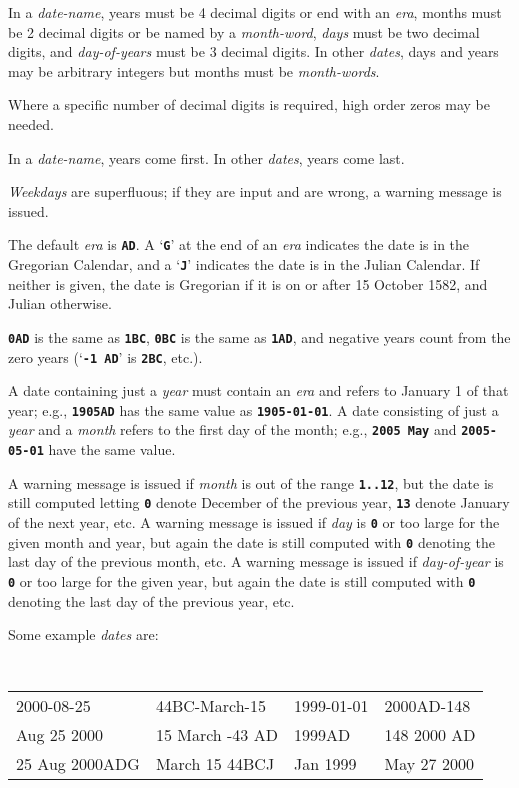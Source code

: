 \documentclass[12pt]{article}
\newcommand{\TT}[1]{{\tt \bfseries #1}}
\newenvironment{indpar}[1][0.3in]%
	{\begin{list}{}%
		     {\setlength{\itemsep}{0in}%
		      \setlength{\topsep}{0in}%
		      \setlength{\parsep}{1ex}%
		      \setlength{\labelwidth}{#1}%
		      \setlength{\leftmargin}{#1}%
		      \addtolength{\leftmargin}{\labelsep}}%
	 \item}%
	{\end{list}}
\begin{document}
In a {\em date-name}, years must be 4 decimal digits or
end with an {\em era}, months must be 2 decimal digits or
be named by a {\em month-word}, {\em days} must be two decimal
digits, and {\em day-of-years} must be 3 decimal digits.
In other {\em dates}, days and years may be arbitrary integers
but months must be {\em month-words}.

Where a specific number of decimal digits is required,
high order zeros may be needed.

In a {\em date-name}, years come first.  In other {\em dates},
years come last.

{\em Weekdays} are superfluous; if they are input and are wrong,
a warning message is issued.

The default {\em era} is \TT{AD}.
A `\TT{G}' at the end of an {\em era} indicates the date is in the
Gregorian Calendar, and a `\TT{J}' indicates the date is in the Julian
Calendar.  If neither is given, the date is Gregorian if it is on
or after 15 October 1582, and Julian otherwise.

\TT{0AD} is the same as \TT{1BC}, \TT{0BC} is the same as \TT{1AD},
and negative years count from the zero years (`\TT{-1 AD}' is \TT{2BC},
etc.).

A date containing just a {\em year} must contain an {\em era}
and refers to January 1 of that
year; e.g., \TT{1905AD} has the same value as \TT{1905-01-01}.
A date consisting of just a {\em year} and a {\em month}
refers to the first day of the month;
e.g., \TT{2005 May} and \TT{2005-05-01} have the same value.

A warning message is issued if {\em month} is out of the range
\TT{1..12}, but the date is still computed letting \TT{0} denote
December of the previous year, \TT{13} denote January of the
next year, etc.  A warning message is issued if {\em day} is
\TT{0} or too large for the given month and year, but again
the date is still computed with \TT{0} denoting the last day of
the previous month, etc.
A warning message is issued if {\em day-of-year} is
\TT{0} or too large for the given year, but again
the date is still computed with \TT{0} denoting the last day of
the previous year, etc.

Some example {\em dates} are:

\begin{indpar}[0.1in]
\tt
\begin{tabular}{@{}l@{~~}l@{~~}l@{~~}l@{}}
2000-08-25	& 44BC-March-15   & 1999-01-01   & 2000AD-148 \\
Aug 25 2000	& 15 March -43 AD & 1999AD       & 148 2000 AD \\
25 Aug 2000ADG	& March 15 44BCJ  & Jan 1999     & May 27 2000 \\
\end{tabular}
\end{indpar}
\end{document}

